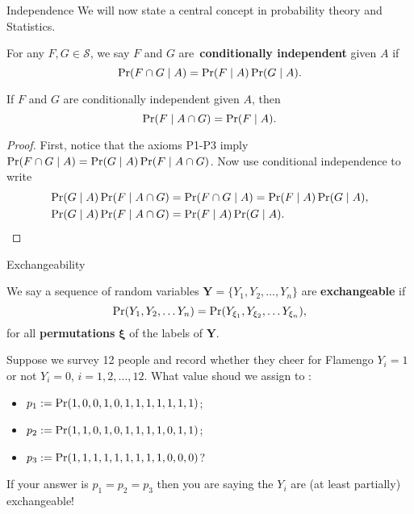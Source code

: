 \begin{frame}{Independence}
We will now state a central concept in probability theory and Statistics.
 \begin{defn}
  For any $F, G \in \mathcal{S}$, we say $F$ and $G$ are~\textbf{conditionally independent} given $A$ if 
  $$ \operatorname{Pr}(F \cap G \mid A) = \operatorname{Pr}(F\mid A)\operatorname{Pr}(G\mid A).$$  
 \end{defn}
\begin{remark}
 \label{rmk:conditional_indep}
 If $F$ and $G$ are conditionally independent given $A$, then
 $$ \operatorname{Pr}(F \mid A \cap G) = \operatorname{Pr}(F \mid A).$$
\end{remark}
\begin{proof}
 First, notice that the axioms P1-P3 imply $\operatorname{Pr}(F \cap G \mid A) = \operatorname{Pr}(G\mid A)\operatorname{Pr}(F \mid A \cap G)$.
 Now use conditional independence to write
 \begin{align*}
  \operatorname{Pr}(G \mid A) \operatorname{Pr}(F \mid A \cap G) &= \operatorname{Pr}(F \cap G \mid A) = \operatorname{Pr}(F\mid A)\operatorname{Pr}(G\mid A),\\
  \operatorname{Pr}(G\mid A) \operatorname{Pr}(F \mid A \cap G) &= \operatorname{Pr}(F\mid A) \operatorname{Pr}(G \mid A).
 \end{align*} 
\end{proof} 
\end{frame}
\begin{frame}{Exchangeability} 
\begin{defn}[Exchangeable]
 \label{def:exchangeable}
We say a sequence of random variables $\boldsymbol{Y} = \{ Y_1, Y_2, \ldots, Y_n \}$ are \textbf{exchangeable} if 
$$ \operatorname{Pr}(Y_1, Y_2, \ldots Y_n) = \operatorname{Pr}(Y_{\xi_1}, Y_{\xi_2}, \ldots Y_{\xi_n}),$$
for all \textbf{permutations} $\boldsymbol{\xi}$ of the labels of $\boldsymbol{Y}$.
\end{defn}
\begin{example}
 Suppose we survey 12 people and record whether they cheer for Flamengo $Y_i = 1$ or not $Y_i = 0$, $i=1, 2,\ldots, 12$.
 What value shoud we assign to :
 \begin{itemize}
  \item $p_1 := \operatorname{Pr}(1, 0, 0, 1, 0, 1, 1, 1, 1, 1, 1, 1)$;
  \item $p_2 :=\operatorname{Pr}(1, 1, 0, 1, 0, 1, 1, 1, 1, 0, 1, 1)$;
  \item $p_3 := \operatorname{Pr}(1, 1, 1, 1, 1, 1, 1, 1, 1, 0, 0, 0)$?
 \end{itemize}
If your answer is $p_1 = p_2 = p_3$ then you are saying the $Y_i$ are (at least partially) exchangeable!
\end{example}
\end{frame}
